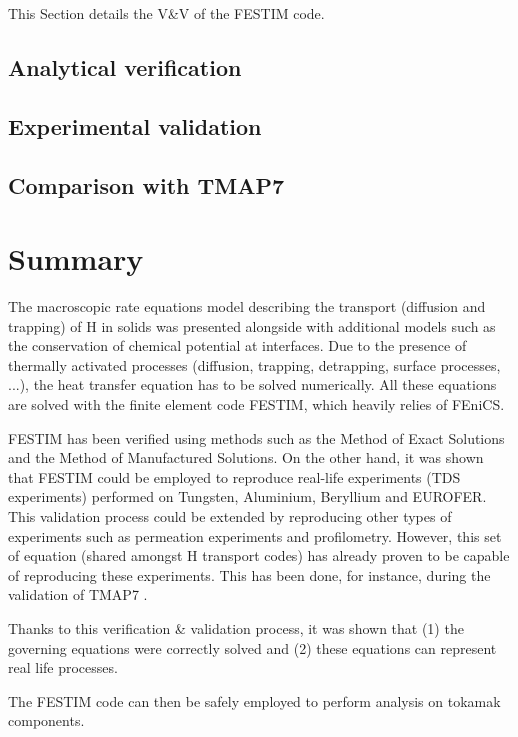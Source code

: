 This Section details the V\&V of the FESTIM code.

\subsection{Analytical verification}



\subsection{Experimental validation}



\subsection{Comparison with TMAP7}



\section{Summary}

The macroscopic rate equations model describing the transport (diffusion and trapping) of H in solids was presented alongside with additional models such as the conservation of chemical potential at interfaces.
Due to the presence of thermally activated processes (diffusion, trapping, detrapping, surface processes, ...), the heat transfer equation has to be solved numerically.
All these equations are solved with the finite element code FESTIM, which heavily relies of FEniCS.

FESTIM has been verified using methods such as the Method of Exact Solutions and the Method of Manufactured Solutions.
On the other hand, it was shown that FESTIM could be employed to reproduce real-life experiments (TDS experiments) performed on Tungsten, Aluminium, Beryllium and EUROFER.
This validation process could be extended by reproducing other types of experiments such as permeation experiments and profilometry.
However, this set of equation (shared amongst H transport codes) has already proven to be capable of reproducing these experiments.
This has been done, for instance, during the validation of TMAP7 .

Thanks to this verification \& validation process, it was shown that (1) the governing equations were correctly solved and (2) these equations can represent real life processes.

The FESTIM code can then be safely employed to perform analysis on tokamak components.
